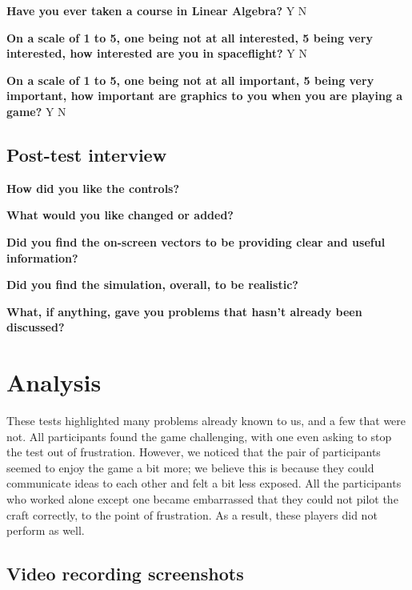 \vspace{5mm}
\noindent\textbf{Have you ever taken a course in Linear Algebra?} Y N

\vspace{5mm}
\noindent\textbf{On a scale of 1 to 5, one being not at all interested, 5 being very interested, how interested are you in spaceflight?} Y N

\vspace{5mm}
\noindent\textbf{On a scale of 1 to 5, one being not at all important, 5 being very important, how important are graphics to you when you are playing a game?} Y N

\subsection{Post-test interview}

\vspace{5mm}
\noindent\textbf{How did you like the controls?}

\vspace{5mm}
\noindent\textbf{What would you like changed or added?}

\vspace{5mm}
\noindent\textbf{Did you find the on-screen vectors to be providing clear and useful information?}

\vspace{5mm}
\noindent\textbf{Did you find the simulation, overall, to be realistic?}

\vspace{5mm}
\noindent\textbf{What, if anything, gave you problems that hasn't already been discussed?}

\section{Analysis}

These tests highlighted many problems already known to us, and a few that were not.  All participants found the game challenging, with one even asking to stop the test out of frustration.  However, we noticed that the pair of participants seemed to enjoy the game a bit more; we believe this is because they could communicate ideas to each other and felt a bit less exposed.  All the participants who worked alone except one became embarrassed that they could not pilot the craft correctly, to the point of frustration.  As a result, these players did not perform as well.

\subsection{Video recording screenshots}

